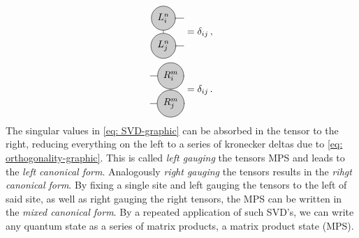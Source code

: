 \documentclass[twoside,twocolumn,9pt]{article}
\begin{document}
\begin{align} \label{eq: orthogonality-graphic}
  \begin{split}
    \begin{tikzpicture}[baseline={([yshift=-.5ex]current bounding box.center)}]
      \draw[gray, thick] (0,0) -- (0,-1);
      \draw[gray, thick] (0,0) -- (0.75,0);
      \draw[gray, thick] (0,-1) -- (0.75,-1);
      \node[draw, circle, line cap=round, fill=black!20, minimum size=12] at (0,0) {$L_i^n$};
      \node[draw, circle, line cap=round, fill=black!20, minimum size=12] at (0,-1) {$L_j^n$};
    \end{tikzpicture} &= \delta_{ij} \thinspace ,\\
    \begin{tikzpicture}[baseline={([yshift=-.5ex]current bounding box.center)}]
      \draw[gray, thick] (0,0) -- (0,-1);
      \draw[gray, thick] (0,0) -- (-0.75,0);
      \draw[gray, thick] (0,-1) -- (-0.75,-1);
      \node[draw, circle, line cap=round, fill=black!20, minimum size=12] at (0,0) {$R_i^m$};
      \node[draw, circle, line cap=round, fill=black!20, minimum size=12] at (0,-1) {$R_j^m$};
    \end{tikzpicture} &= \delta_{ij} \thinspace .
  \end{split}
\end{align}
The singular values in \cref{eq: SVD-graphic} can be absorbed in the tensor to the right, reducing everything on the left to a series of kronecker deltas due to \cref{eq: orthogonality-graphic}. This is called \emph{left gauging} the tensors MPS and leads to the \emph{left canonical form}. Analogously \emph{right gauging} the tensors results in the \emph{rihgt canonical form}. By fixing a single site and left gauging the tensors to the left of said site, as well as right gauging the right tensors, the MPS can be written in the \emph{mixed canonical form}. By a repeated application of such SVD's, we can write any quantum state as a series of matrix products, a matrix product state (MPS).
\end{document}
